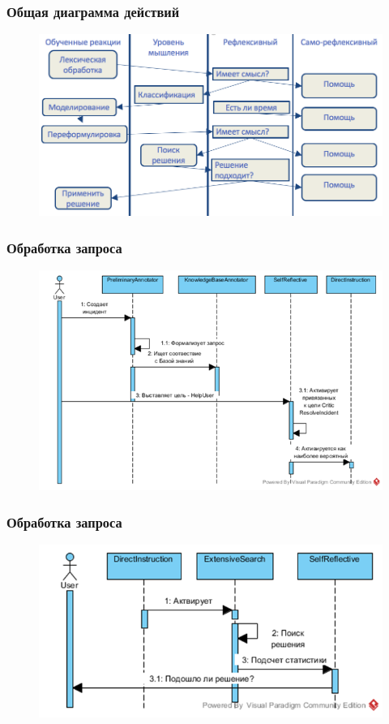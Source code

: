 \documentclass[14pt]{beamer}
\begin{document}
\begin{frame}
\frametitle{Общая диаграмма действий}
\begin{figure} [h] 
  \center
  \includegraphics [scale=0.35] {ShortLefecycle}
  \label{img:ShortLefecycle}  
\end{figure}
\end{frame}


\begin{frame}
\frametitle{Обработка запроса}
\begin{figure} [h] 
	\center
	\includegraphics [scale=0.7] {RequestProcesssing}
	\label{img:RequestProcesssing}  
\end{figure}
\end{frame}

\begin{frame}
\frametitle{Обработка запроса}
\begin{figure} [h] 
	\center
	\includegraphics [scale=0.7] {RequestProcesssing2}
	\label{img:RequestProcesssing2}  
\end{figure}
\end{frame}
\end{document}
